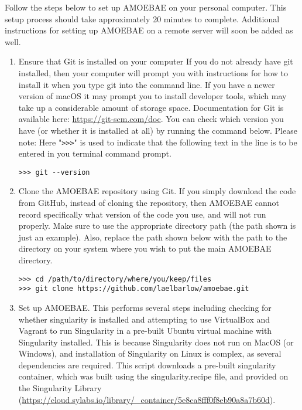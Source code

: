 \documentclass[12pt,letterpaper]{article}
\begin{document}
\begin{linenumbers}

Follow the steps below to set up AMOEBAE on your personal computer. This setup
process should take approximately 20 minutes to complete. Additional instructions for
setting up AMOEBAE on a remote server will soon be added as well.

\begin{enumerate}

\item Ensure that Git is installed on your computer If you do not already have
    git installed, then your computer will prompt you with instructions for how
        to install it when you type git into the command line. If you have a
        newer version of macOS it may prompt you to install developer tools,
        which may take up a considerable amount of storage space. Documentation
        for Git is available here: \url{https://git-scm.com/doc}. You can check
        which version you have (or whether it is installed at all) by running
        the command below. Please note: Here "\texttt{>{}>{}>}" is
        used to indicate that the following text in the line is to be entered
        in you terminal command prompt. 

\begin{lstlisting}
>>> git --version
\end{lstlisting}

\item Clone the AMOEBAE repository using Git. If you simply download the code
    from GitHub, instead of cloning the repository, then AMOEBAE cannot record
        specifically what version of the code you use, and will not run
        properly. Make sure to use the appropriate directory path (the path
        shown is just an example). Also, replace the path shown below with
        the path to the directory on your system where you wish to put the main
        AMOEBAE directory.

\begin{lstlisting}
>>> cd /path/to/directory/where/you/keep/files
>>> git clone https://github.com/laelbarlow/amoebae.git
\end{lstlisting}

\item Set up AMOEBAE. This performs several steps including checking for
    whether singularity is installed and attempting to use VirtualBox and
        Vagrant to run Singularity in a pre-built Ubuntu virtual machine with
        Singularity installed. This is because Singularity does not run on
        MacOS (or Windows), and installation of Singularity on Linux is
        complex, as several dependencies are required. This script downloads
        a pre-built singularity container, which was built using the
        singularity.recipe file, and provided on the Singularity Library
        (\url{https://cloud.sylabs.io/library/_container/5e8ca8fff0f8eb90a8a7b60d}).


\end{enumerate}
\end{linenumbers}
\end{document}
